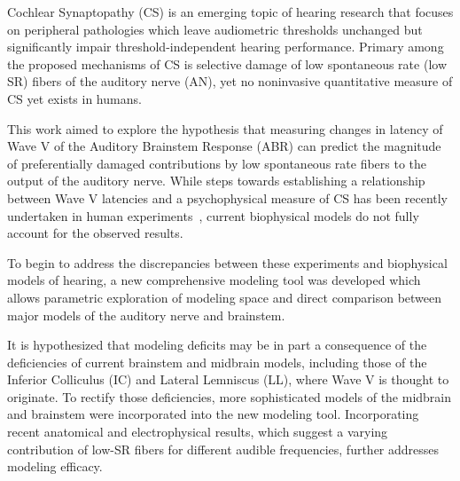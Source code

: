 Cochlear Synaptopathy (CS) is an emerging topic of hearing research that focuses on peripheral pathologies which leave audiometric thresholds unchanged but significantly impair threshold-independent hearing performance. Primary among the proposed mechanisms of CS is selective damage of low spontaneous rate (low SR) fibers of the auditory nerve (AN), yet no noninvasive quantitative measure of CS yet exists in humans.

This work aimed to explore the hypothesis that measuring changes in latency of Wave V of the Auditory Brainstem Response (ABR) can predict the magnitude of preferentially damaged contributions by low spontaneous rate fibers to the output of the auditory nerve. While steps towards establishing a relationship between Wave V latencies and a psychophysical measure of CS has been recently undertaken in human experiments~\citep{Mehraei2016Auditory}, current biophysical models do not fully account for the observed results.

To begin to address the discrepancies between these experiments and biophysical models of hearing, a new comprehensive modeling tool was developed which allows parametric exploration of modeling space and direct comparison between major models of the auditory nerve and brainstem. 

It is hypothesized that modeling deficits may be in part a consequence of the deficiencies of current brainstem and midbrain models, including those of the Inferior Colliculus (IC) and Lateral Lemniscus (LL), where Wave V is thought to originate.  To rectify those deficiencies, more sophisticated models of the midbrain and brainstem were incorporated into the new modeling tool. Incorporating recent anatomical and electrophysical results, which suggest a varying contribution of low-SR fibers for different audible frequencies, further addresses modeling efficacy.
